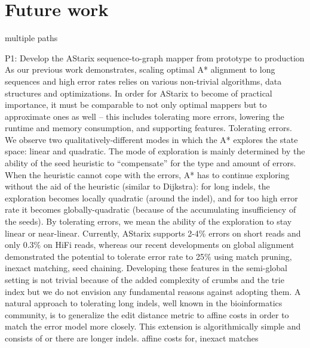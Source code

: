 \section{Future work}

multiple paths

P1: Develop the AStarix sequence-to-graph mapper from prototype to production
As our previous work demonstrates, scaling optimal A* alignment to long sequences and high error rates relies on various non-trivial algorithms, data structures and optimizations. In order for AStarix to become of practical importance, it must be comparable to not only optimal mappers but to approximate ones as well – this includes tolerating more errors, lowering the runtime and memory consumption, and supporting features.
Tolerating errors. We observe two qualitatively-different modes in which the A* explores the state space: linear and quadratic. The mode of exploration is mainly determined by the ability of the seed heuristic to “compensate” for the type and amount of errors. When the heuristic cannot cope with the errors, A* has to continue exploring without the aid of the heuristic (similar to Dijkstra): for long indels, the exploration becomes locally quadratic (around the indel), and for too high error rate it becomes globally-quadratic (because of the accumulating insufficiency of the seeds). By tolerating errors, we mean the ability of the exploration to stay linear or near-linear. Currently, AStarix supports 2-4\% errors on short reads and only 0.3\% on HiFi reads, whereas our recent developments on global alignment demonstrated the potential to tolerate error rate to 25\% using match pruning, inexact matching, seed chaining. Developing these features in the semi-global setting is not trivial because of the added complexity of crumbs and the trie index but we do not envision any fundamental reasons against adopting them. A natural approach to tolerating long indels, well known in the bioinformatics community, is to generalize the edit distance metric to affine costs in order to match the error model more closely. This extension is algorithmically simple and consists of or there are longer indels. affine costs for, inexact matches
